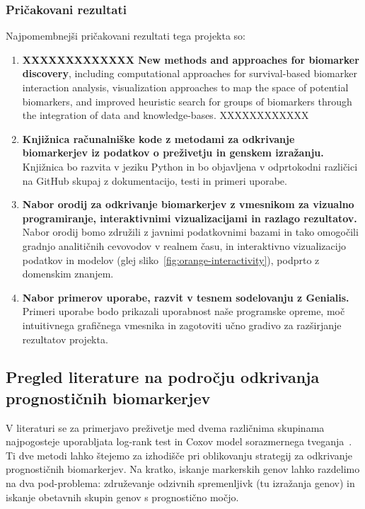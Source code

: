 \documentclass[11pt,a4paper]{article}
\renewcommand{\bold}{\textbf}
\begin{document}
\subsubsection*{Pričakovani rezultati}
Najpomembnejši pričakovani rezultati tega projekta so:
\begin{enumerate}
	\item \bold{XXXXXXXXXXXXX New methods and approaches for biomarker discovery}, including computational approaches for survival-based biomarker interaction analysis, visualization approaches to map the space of potential biomarkers, and improved heuristic search for groups of biomarkers through the integration of data and knowledge-bases. XXXXXXXXXXXX
	\item \bold{Knjižnica računalniške kode z metodami za odkrivanje biomarkerjev iz podatkov o preživetju in genskem izražanju.} Knjižnica bo razvita v jeziku Python in bo objavljena v odprtokodni različici na GitHub skupaj z dokumentacijo, testi in primeri uporabe.
	\item \bold{Nabor orodij za odkrivanje biomarkerjev z vmesnikom za vizualno programiranje, interaktivnimi vizualizacijami in razlago rezultatov.} Nabor orodij bomo združili z javnimi podatkovnimi bazami in tako omogočili gradnjo analitičnih cevovodov v realnem času, in interaktivno vizualizacijo podatkov in modelov (glej sliko~\ref{fig:orange-interactivity}), podprto z domenskim znanjem.
	\item \bold{Nabor primerov uporabe, razvit v tesnem sodelovanju z Genialis.} Primeri uporabe bodo prikazali uporabnost naše programske opreme, moč intuitivnega grafičnega vmesnika in zagotoviti učno gradivo za razširjanje rezultatov projekta.
\end{enumerate}



\subsection{Pregled literature na področju odkrivanja prognostičnih biomarkerjev}

V literaturi se za primerjavo preživetje med dvema različnima skupinama najpogosteje uporabljata log-rank test in Coxov model sorazmernega tveganja~\cite{singh2011survival}. Ti dve metodi lahko štejemo za izhodišče pri oblikovanju strategij za odkrivanje prognostičnih biomarkerjev. Na kratko, iskanje markerskih genov lahko razdelimo na dva pod-problema: združevanje odzivnih spremenljivk (tu izražanja genov) in iskanje obetavnih skupin genov s prognostično močjo.
\end{document}
